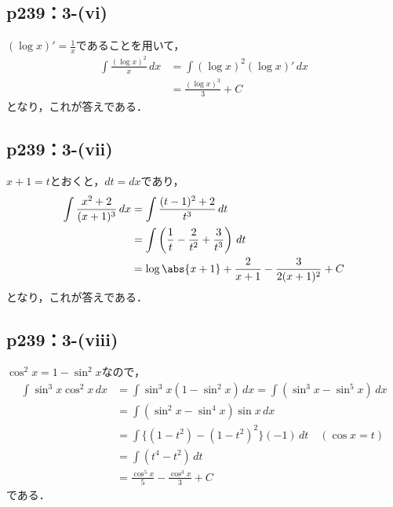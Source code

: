 \documentclass[a4paper,10pt,fleqn]{ltjsarticle}
\begin{document}
\newpage

\subsection*{p239：3-(vi)}

\begin{tleftbar}
    $(\log x)' = \frac{1}{x}$であることを用いて，
    \begin{align*}
        \int \frac{(\log x)^2}{x} \, dx & = \int (\log x)^2 (\log x)' \, dx \\
                                        & = \frac{(\log x)^3}{3} + C
    \end{align*}
    となり，これが答えである．
\end{tleftbar}

\subsection*{p239：3-(vii)}

\begin{tleftbar}
    $x+1 =t$とおくと，$dt=dx$であり，
    \begin{align*}
        \int \frac{x^2+2}{(x+1)^3} \, dx & = \int \frac{(t-1)^2+2}{t^3} \, dt                                 \\
                                         & = \int \left (\frac{1}{t}-\frac{2}{t^2}+\frac{3}{t^3}\right) \, dt \\
                                         & = \log \abs{x+1}+\frac{2}{x+1}-\frac{3}{2(x+1)^2}+C
    \end{align*}
    となり，これが答えである．
\end{tleftbar}

\subsection*{p239：3-(viii)}

\begin{tleftbar}
    $\cos ^2 x = 1- \sin ^2 x$なので，
    \begin{align*}
        \int \sin ^3 x \cos ^2 x \, dx & = \int \sin ^3 x (1-\sin ^2 x) \, dx = \int (\sin ^3 x - \sin ^5 x ) \, dx \\
                                       & = \int (\sin ^2 x - \sin ^4 x) \sin x \, dx                                \\
                                       & = \int \{ (1-t^2)- (1-t^2)^2 \} (-1) \, dt \quad (\cos x =t)               \\
                                       & = \int (t^4 -t^2) \, dt                                                    \\
                                       & = \frac{\cos ^5 x}{5}-\frac{\cos ^3 x}{3}+C
    \end{align*}
    である．
\end{tleftbar}
\end{document}
